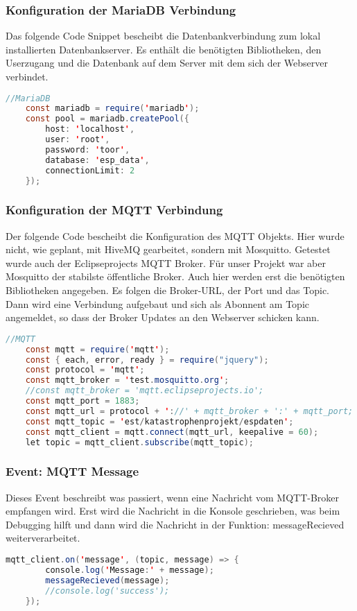 \subsubsection{Konfiguration der MariaDB Verbindung}
Das folgende Code Snippet bescheibt die Datenbankverbindung zum lokal installierten Datenbankserver. Es enthält die benötigten Bibliotheken, den Userzugang und die Datenbank auf dem Server mit dem sich der Webserver verbindet.
\begin{lstlisting}[language=java]
	//MariaDB
	const mariadb = require('mariadb');
	const pool = mariadb.createPool({
		host: 'localhost',
		user: 'root',
		password: 'toor',
		database: 'esp_data',
		connectionLimit: 2
	});
\end{lstlisting}

\subsubsection{Konfiguration der MQTT Verbindung}
Der folgende Code bescheibt die Konfiguration des MQTT Objekts. Hier wurde nicht, wie geplant, mit HiveMQ gearbeitet, sondern mit Mosquitto. Getestet wurde auch der Eclipseprojects MQTT Broker. Für unser Projekt war aber Mosquitto der stabilste öffentliche Broker. Auch hier werden erst die benötigten Bibliotheken angegeben. Es folgen die Broker-URL, der Port und das Topic. Dann wird eine Verbindung aufgebaut und sich als Abonnent am Topic angemeldet, so dass der Broker Updates an den Webserver schicken kann.
\begin{lstlisting}[language=java]
	//MQTT
	const mqtt = require('mqtt');
	const { each, error, ready } = require("jquery");
	const protocol = 'mqtt';
	const mqtt_broker = 'test.mosquitto.org';
	//const mqtt_broker = 'mqtt.eclipseprojects.io';
	const mqtt_port = 1883;
	const mqtt_url = protocol + '://' + mqtt_broker + ':' + mqtt_port;
	const mqtt_topic = 'est/katastrophenprojekt/espdaten';
	const mqtt_client = mqtt.connect(mqtt_url, keepalive = 60);
	let topic = mqtt_client.subscribe(mqtt_topic);
\end{lstlisting}

\subsubsection{Event: MQTT Message}
Dieses Event beschreibt was passiert, wenn eine Nachricht vom MQTT-Broker empfangen wird. Erst wird die Nachricht in die Konsole geschrieben, was beim Debugging hilft und dann wird die Nachricht in der Funktion: messageRecieved weiterverarbeitet.
\begin{lstlisting}[language=java]
	mqtt_client.on('message', (topic, message) => {
		console.log('Message:' + message);
		messageRecieved(message);
		//console.log('success');
	});
\end{lstlisting}

